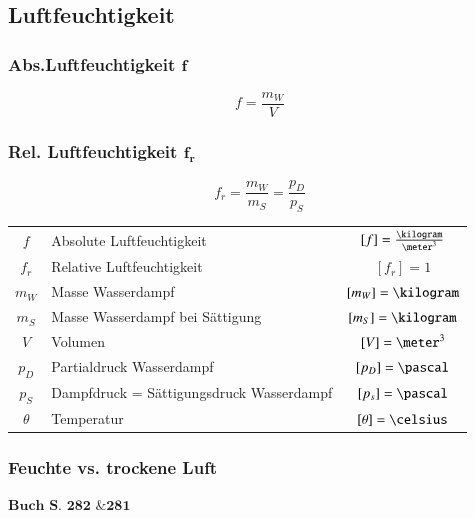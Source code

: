 \subsection{Luftfeuchtigkeit}

\begin{minipage}[t]{0.48\columnwidth}
	\subsubsection{Abs.Luftfeuchtigkeit $\bm{f}$}
	
	\vspace{-0.2cm}
	
	$$ \boxed{ f = \frac{m_W}{V}  } $$
\end{minipage}
\hfill
\begin{minipage}[t]{0.48\columnwidth}
	\subsubsection{Rel. Luftfeuchtigkeit $\boldsymbol{f_r}$}
	
	\vspace{-0.2cm}
	
	$$ \boxed{ f_r = \frac{m_W}{m_S} = \frac{p_D}{p_S}} $$
\end{minipage}

\medskip

\begin{tabular}{c l c}
	$f$ 		& Absolute Luftfeuchtigkeit 				& $[f] = \frac{\kilogram}{\meter^3}$ 			\\
	$f_r$ 		& Relative Luftfeuchtigkeit 				& $[f_r] = 1$ 			\\
	$m_W$ 		& Masse Wasserdampf 						& $[m_W] = \kilogram$ 	\\
	$m_S$ 		& Masse Wasserdampf bei Sättigung 			& $[m_S] = \kilogram$ 	\\
	$V$ 		& Volumen 									& $[V] = \meter^3$ 		\\
	$p_D$ 		& Partialdruck Wasserdampf 					& $[p_D] = \pascal$ 	\\
	$p_S$ 		& Dampfdruck = Sättigungsdruck Wasserdampf 	& $[p_s] = \pascal$ 	\\
	$\theta$ 	& Temperatur 								& $[\theta] = \celsius$
\end{tabular}


\subsubsection{Feuchte vs. trockene Luft}
\begin{flushright}
	$\boxed{\textbf{Buch S. 282 \& 281}}$
\end{flushright}


